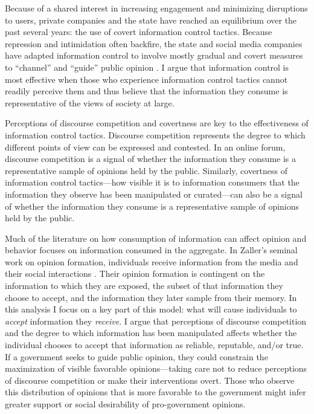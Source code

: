 \documentclass[11pt]{article}
\begin{document}
Because of a shared interest in increasing engagement and minimizing disruptions to users, private companies and the state have reached an equilibrium over the past several years: the use of covert information control tactics. Because repression and intimidation often backfire, the state and social media companies have adapted information control to involve mostly gradual and covert measures to ``channel'' and ``guide'' public opinion \citep{roberts2018censored,roberts2017censorship}. I argue that information control is most effective when those who experience information control tactics cannot readily perceive them and thus believe that the information they consume is representative of the views of society at large.

Perceptions of discourse competition and covertness are key to the effectiveness of information control tactics. Discourse competition represents the degree to which different points of view can be expressed and contested. In an online forum, discourse competition is a signal of whether the information they consume is a representative sample of opinions held by the public. Similarly, covertness of information control tactics---how visible it is to information consumers that the information they observe has been manipulated or curated---can also be a signal of whether the information they consume is a representative sample of opinions held by the public.

Much of the literature on how consumption of information can affect opinion and behavior focuses on information consumed in the aggregate. In Zaller's seminal work on opinion formation, individuals receive information from the media and their social interactions \citep{zaller1992nature}. Their opinion formation is contingent on the information to which they are exposed, the subset of that information they choose to accept, and the information they later sample from their memory. In this analysis I focus on a key part of this model: what will cause individuals to {\it accept} information they {\it receive}. I argue that perceptions of discourse competition and the degree to which information has been manipulated affects whether the individual chooses to accept that information as reliable, reputable, and/or true. If a government seeks to guide public opinion, they could constrain the maximization of visible favorable opinions---taking care not to reduce perceptions of discourse competition or make their interventions overt. Those who observe this distribution of opinions that is more favorable to the government might infer greater support or social desirability of pro-government opinions.
\end{document}
